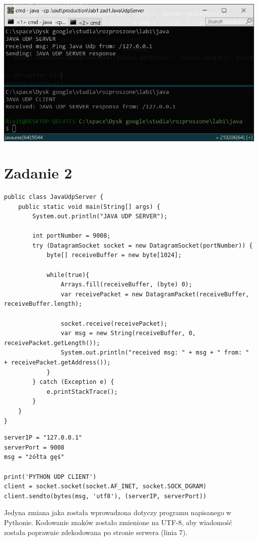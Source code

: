 \documentclass[12pt]{article}
\begin{document}
\begin{center}
\centering
    \includegraphics[scale=0.8]{1.png}
\end{center}


\section{Zadanie 2}
\begin{verbatim}
public class JavaUdpServer {
    public static void main(String[] args) {
        System.out.println("JAVA UDP SERVER");

        int portNumber = 9008;
        try (DatagramSocket socket = new DatagramSocket(portNumber)) {
            byte[] receiveBuffer = new byte[1024];

            while(true){
                Arrays.fill(receiveBuffer, (byte) 0);
                var receivePacket = new DatagramPacket(receiveBuffer, receiveBuffer.length);

                socket.receive(receivePacket);
                var msg = new String(receiveBuffer, 0, receivePacket.getLength());
                System.out.println("received msg: " + msg + " from: " + receivePacket.getAddress());
            }
        } catch (Exception e) {
            e.printStackTrace();
        }
    }
}
\end{verbatim}


\begin{verbatim}
serverIP = "127.0.0.1"
serverPort = 9008
msg = "żółta gęś"

print('PYTHON UDP CLIENT')
client = socket.socket(socket.AF_INET, socket.SOCK_DGRAM)
client.sendto(bytes(msg, 'utf8'), (serverIP, serverPort))
\end{verbatim}

Jedyna zmiana jaka została wprowadzona dotyczy programu napisanego w Pythonie. Kodowanie znaków zostało zmienione na UTF-8, aby wiadomość została poprawnie zdekodowana po stronie serwera (linia 7).
\end{document}
